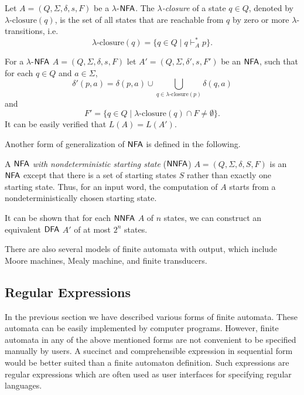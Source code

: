 Let $A = (Q, \Sigma, \delta, s, F)$ be a \index{$\lambda$-$\NFA$}$\lambda$-$\NFA$. The \emph{$\lambda$-closure} of a state $q \in Q$, denoted by $\lambda \text{-closure}(q)$, is the set of all states that are reachable from $q$ by zero or more $\lambda$-transitions, i.e. $$\lambda \text{-closure}(q) = \{q \in Q \mid q \vdash_A^* p \}.$$

For a \index{$\lambda$-$\NFA$}$\lambda$-$\NFA$ $A = (Q, \Sigma, \delta, s, F)$ let $A' = (Q, \Sigma, \delta', s, F')$ be an \index{$\NFA$}$\NFA$, such that for each $q \in Q$ and $a \in \Sigma$, $$\delta'(p, a) = \delta(p, a) \cup \bigcup_{q \in \lambda \text{-closure}(p)}\delta(q, a)$$ and $$F' = \{ q \in Q \mid \lambda\text{-closure}(q) \cap F \neq \emptyset \}.$$ It can be easily verified that $L(A) = L(A')$.

Another form of generalization of \index{$\NFA$}$\NFA$ is defined in the following.

A \emph{$\NFA$ with nondeterministic starting state} \index{$\NNFA$}($\NNFA$) $A = (Q, \Sigma, \delta, S, F)$ is an \index{$\NFA$}$\NFA$ except that there is a set of starting states $S$ rather than exactly one starting state. Thus, for an input word, the computation of $A$ starts from a nondeterministically chosen starting state.

It can be shown that for each $\NNFA$ $A$ of $n$ states, we can construct an equivalent \index{$\DFA$}$\DFA$ $A'$ of at most $2^n$ states.

There are also several models of finite automata with output, which include Moore machines, Mealy machine, and finite transducers.

\subsection{Regular Expressions}
\label{subsection:regular-expressions}

In the previous section we have described various forms of finite automata. These automata can be easily implemented by computer programs. However, finite automata in any of the above mentioned forms are not convenient to be specified manually by users. A succinct and comprehensible expression in sequential form would be better suited than a finite automaton definition. Such expressions are regular expressions which are often used as user interfaces for specifying regular languages.

